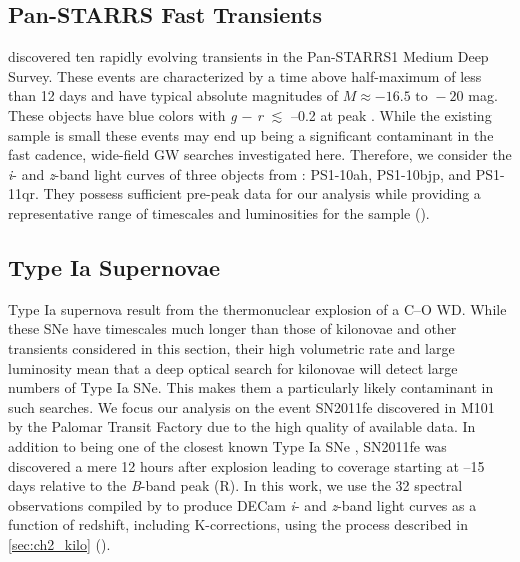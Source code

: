 \subsection{Pan-STARRS Fast Transients}
\label{sec:ch2_PSFast}
\citet{Drout+14} discovered ten rapidly evolving transients in the Pan-STARRS1 Medium Deep Survey. These events are characterized by a time above half-maximum of less than 12 days and have typical absolute magnitudes of $M \approx -16.5 \text{ to } -20$ mag. These objects have blue colors with {\em g} $-$ {\em r} $\lesssim$ --0.2 at peak \citep{Drout+14}. While the existing sample is small these events may end up being a significant contaminant in the fast cadence, wide-field GW searches investigated here. Therefore, we consider the {\em i}- and {\em z}-band light curves of three objects from \citet{Drout+14}: PS1-10ah, PS1-10bjp, and PS1-11qr. They possess sufficient pre-peak data for our analysis while providing a representative range of timescales and luminosities for the sample ().

\subsection{Type Ia Supernovae}
\label{sec:ch2_typeIa}
Type Ia supernova result from the thermonuclear explosion of a C--O WD. While these SNe have timescales much longer than those of kilonovae and other transients considered in this section, their high volumetric rate and large luminosity mean that a deep optical search for kilonovae will detect large numbers of Type Ia SNe. This makes them a particularly likely contaminant in such searches. We focus our analysis on the event SN2011fe discovered in M101 by the Palomar Transit Factory \citep{Nugent+11a} due to the high quality of available data. In addition to being one of the closest known Type Ia SNe \citep[$\mu = 29.04\pm0.19$,][]{ShappeeStanek11}, SN2011fe was discovered a mere 12 hours after explosion \citep{Nugent+11b} leading to coverage starting at --15 days relative to the {\em B}-band peak (R). In this work, we use the 32 spectral observations compiled by \citet{Pereira+13} to produce DECam {\em i}- and {\em z}-band light curves as a function of redshift, including K-corrections, using the process described in \cref{sec:ch2_kilo} ().

